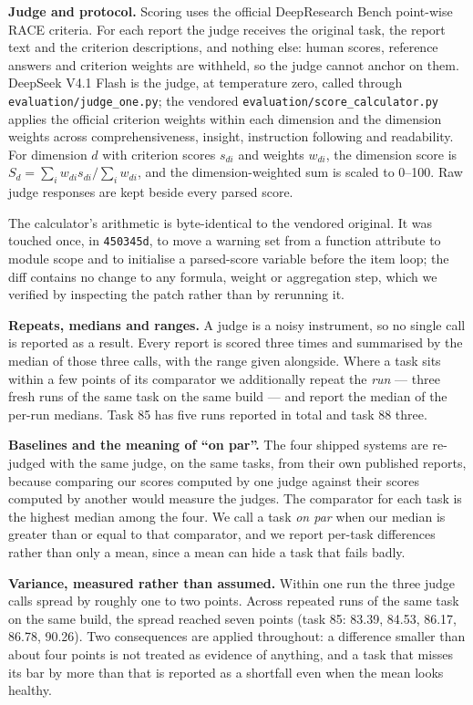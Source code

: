 \documentclass[conference]{IEEEtran}
\begin{document}
\textbf{Judge and protocol.} Scoring uses the official DeepResearch Bench point-wise RACE criteria. For
each report the judge receives the original task, the report text and the criterion descriptions, and
nothing else: human scores, reference answers and criterion weights are withheld, so the judge cannot
anchor on them. DeepSeek V4.1 Flash is the judge, at temperature zero, called through
\texttt{evaluation/judge\_one.py}; the vendored \texttt{evaluation/score\_calculator.py} applies the
official criterion weights within each dimension and the dimension weights across comprehensiveness,
insight, instruction following and readability. For dimension $d$ with criterion scores $s_{di}$ and
weights $w_{di}$, the dimension score is $S_d = \sum_i w_{di} s_{di} / \sum_i w_{di}$, and the
dimension-weighted sum is scaled to 0--100. Raw judge responses are kept beside every parsed score.

The calculator's arithmetic is byte-identical to the vendored original. It was touched once, in
\texttt{450345d}, to move a warning set from a function attribute to module scope and to initialise a
parsed-score variable before the item loop; the diff contains no change to any formula, weight or
aggregation step, which we verified by inspecting the patch rather than by rerunning it.

\textbf{Repeats, medians and ranges.} A judge is a noisy instrument, so no single call is reported as a
result. Every report is scored three times and summarised by the median of those three calls, with the
range given alongside. Where a task sits within a few points of its comparator we additionally repeat the
\emph{run} --- three fresh runs of the same task on the same build --- and report the median of the
per-run medians. Task 85 has five runs reported in total and task 88 three.

\textbf{Baselines and the meaning of ``on par''.} The four shipped systems are re-judged with the same
judge, on the same tasks, from their own published reports, because comparing our scores computed by one
judge against their scores computed by another would measure the judges. The comparator for each task is
the highest median among the four. We call a task \emph{on par} when our median is greater than or equal
to that comparator, and we report per-task differences rather than only a mean, since a mean can hide a
task that fails badly.

\textbf{Variance, measured rather than assumed.} Within one run the three judge calls spread by roughly
one to two points. Across repeated runs of the same task on the same build, the spread reached seven
points (task 85: 83.39, 84.53, 86.17, 86.78, 90.26). Two consequences are applied throughout: a
difference smaller than about four points is not treated as evidence of anything, and a task that misses
its bar by more than that is reported as a shortfall even when the mean looks healthy.
\end{document}
